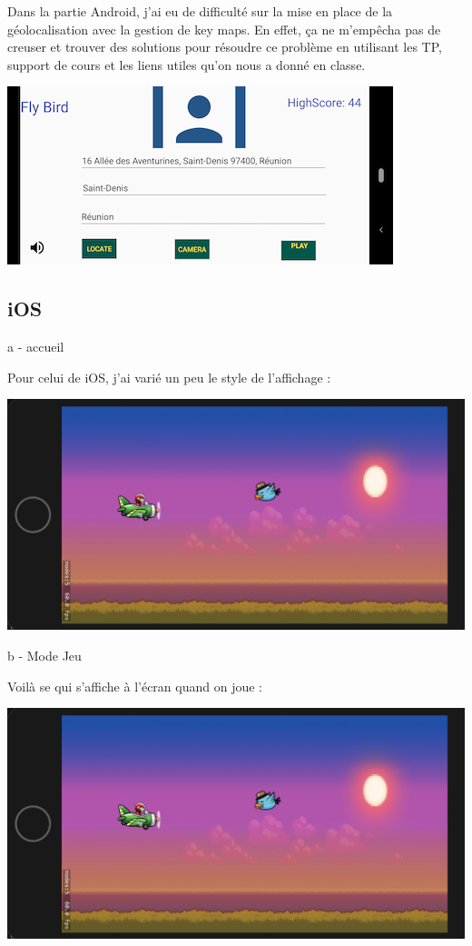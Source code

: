\documentclass{rapportECL}
\begin{document}
Dans la partie Android, j'ai eu de difficulté sur la mise en place de la géolocalisation avec la gestion de key maps. En effet, ça ne m'empêcha pas de creuser et trouver des solutions pour résoudre ce problème en utilisant les TP, support de cours et les liens utiles\cite{Cours} qu'on nous a donné en classe.
\begin{center}
    \includegraphics[scale = 0.5]{logos/geolocalisation.png}
\end{center}
\newpage
\subsection{iOS}
a - accueil

Pour celui de iOS, j'ai varié un peu le style de l'affichage : 

\begin{center}
    \includegraphics[scale = 0.5]{logos/JeuiOS.png}
\end{center}

b - Mode Jeu

Voilà se qui s'affiche à l'écran quand on joue : 

\begin{center}
    \includegraphics[scale = 0.5]{logos/JeuiOS.png}
\end{center}
\end{document}
